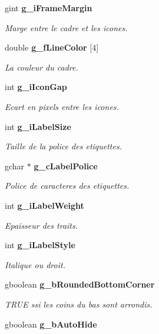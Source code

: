 \begin{CompactItemize}
gint {\bf g\_\-iFrameMargin}
\begin{CompactList}\small\item\em Marge entre le cadre et les icones. \item\end{CompactList}\item 
double {\bf g\_\-fLineColor} [4]
\begin{CompactList}\small\item\em La couleur du cadre. \item\end{CompactList}\item 
int {\bf g\_\-iIconGap}
\begin{CompactList}\small\item\em Ecart en pixels entre les icones. \item\end{CompactList}\item 
int {\bf g\_\-iLabelSize}
\begin{CompactList}\small\item\em Taille de la police des etiquettes. \item\end{CompactList}\item 
gchar $\ast$ {\bf g\_\-cLabelPolice}
\begin{CompactList}\small\item\em Police de caracteres des etiquettes. \item\end{CompactList}\item 
int {\bf g\_\-iLabelWeight}
\begin{CompactList}\small\item\em Epaisseur des traits. \item\end{CompactList}\item 
int {\bf g\_\-iLabelStyle}
\begin{CompactList}\small\item\em Italique ou droit. \item\end{CompactList}\item 
gboolean {\bf g\_\-bRoundedBottomCorner}
\begin{CompactList}\small\item\em TRUE ssi les coins du bas sont arrondis. \item\end{CompactList}\item 
gboolean {\bf g\_\-bAutoHide}

\end{CompactItemize}
